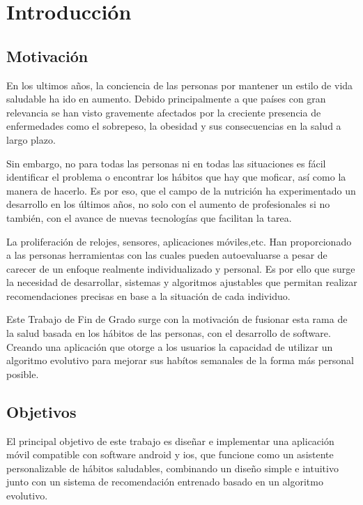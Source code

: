 \chapter{Introducción}
\label{cap:introduccion}


\section{Motivación}
En los ultimos años, la conciencia de las personas por mantener un estilo de vida saludable ha ido en aumento. Debido principalmente a que países con gran relevancia se han visto gravemente afectados por la creciente presencia de enfermedades como el sobrepeso, la obesidad y sus consecuencias en la salud a largo plazo. \cite{oms}

Sin embargo, no para todas las personas ni en todas las situaciones es fácil identificar el problema o encontrar los hábitos que hay que moficar, así como la manera de hacerlo. Es por eso, que el campo de la nutrición ha experimentado un desarrollo en los últimos años, no solo con el aumento de profesionales si no también, con el avance de nuevas tecnologías que facilitan la tarea. \cite{scielo}

La proliferación de relojes, sensores, aplicaciones móviles,etc. Han proporcionado a las personas herramientas con las cuales pueden autoevaluarse  a pesar de carecer de un enfoque realmente individualizado y personal. Es por ello que surge la necesidad de desarrollar, sistemas y algoritmos ajustables que permitan realizar recomendaciones precisas en base a la situación de cada individuo. \cite{Science_direct}

Este Trabajo de Fin de Grado surge con la motivación de fusionar esta rama de la salud basada en los hábitos de las personas, con el desarrollo de software. Creando una aplicación que otorge a los usuarios la capacidad de utilizar un algoritmo evolutivo para mejorar sus habítos semanales de la forma más personal posible. 

  


\section{Objetivos}
El principal objetivo de este trabajo es diseñar e implementar una aplicación móvil compatible con software android y ios, que funcione como un asistente personalizable de hábitos saludables, combinando un diseño simple e intuitivo  junto con un sistema de recomendación entrenado basado en un algoritmo evolutivo.

